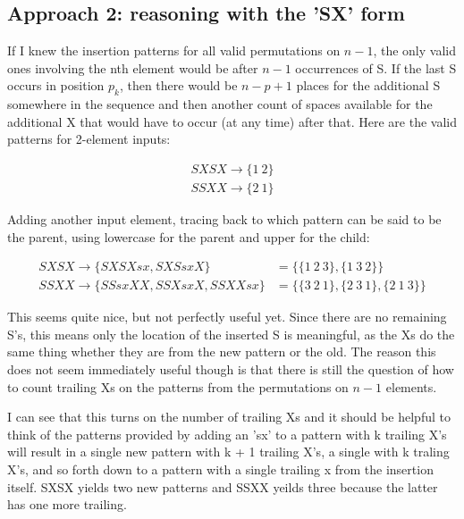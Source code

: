 \documentclass{article}
\begin{document}
\subsection*{Approach 2: reasoning with the 'SX' form}

If I knew the insertion patterns for all valid permutations on $n - 1$, the only valid ones involving the nth element would be after $n - 1$ occurrences of S.  If the last S occurs in position $p_k$, then there would be $n - p + 1$ places for the additional S somewhere in the sequence and then another count of spaces available for the additional X that would have to occur (at any time) after that. Here are the valid patterns for 2-element inputs:

\begin{align*}
  SXSX \rightarrow \{1~2\} \\
  SSXX \rightarrow \{2~1\}
\end{align*}

Adding another input element, tracing back to which pattern can be said to be the parent, using lowercase for the parent and upper for the child:

\begin{align*}
  SXSX \rightarrow \{ SXSXsx, SXSsxX \} &= \{\{1~2~3\},\{1~3~2\}\} \\
  SSXX \rightarrow \{ SSsxXX,SSXsxX,SSXXsx \} &= \{\{3~2~1\},\{2~3~1\},\{2~1~3\}\}
\end{align*}

This seems quite nice, but not perfectly useful yet.  Since there are no remaining S's, this means only the location of the inserted S is meaningful, as the Xs do the same thing whether they are from the new pattern or the old.  The reason this does not seem immediately useful though is that there is still the question of how to count trailing Xs on the patterns from the permutations on $n - 1$ elements.

\par

I can see that this turns on the number of trailing Xs and it should be helpful to think of the patterns provided by adding an 'sx' to a pattern with k trailing X's will result in a single new pattern with k + 1 trailing X's, a single with k traling X's, and so forth down to a pattern with a single trailing x from the insertion itself.  SXSX yields two new patterns and SSXX yeilds three because the latter has one more trailing.

\par
\end{document}
